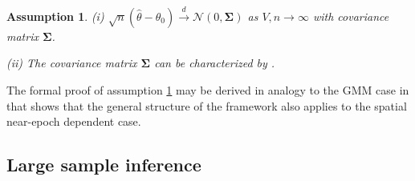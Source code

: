 \documentclass[12pt]{article}
\newtheorem{assume}{Assumption}
\begin{document}
\begin{assume}
	\label{as:clt}
	(i) $\sqrt{n}(\hat{\theta} - \theta_0) \overset{d}{\to} \mathcal{N}(0,\mathbf{\Sigma})$ as $V,n \to \infty$ with covariance matrix $\mathbf{\Sigma}$.
	
	(ii) The covariance matrix $\mathbf{\Sigma}$ can be characterized by \citet[Theorem 11.2.b, Theorem H.1]{PP97}.
\end{assume}

The formal proof of assumption \ref{as:clt} may be derived in analogy to the GMM case in \cite[Theorem 4]{JP12} that shows that the general structure of the \cite{PP97} framework also applies to the spatial near-epoch dependent case.



\subsection{Large sample inference}
\label{sec:asymptotic_inference}
\end{document}
